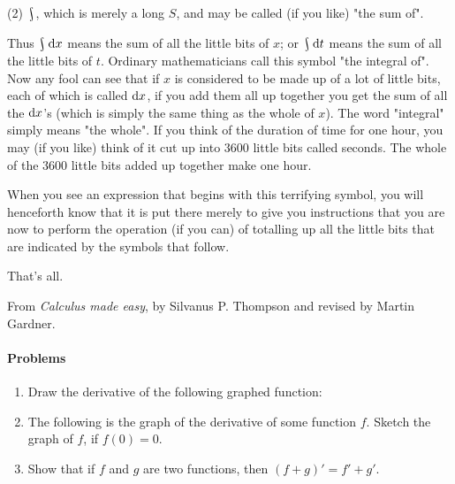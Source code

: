 (2) $ \rint $, which is merely a long $ S $, and may be called (if you like) "the sum of".

Thus $ \rint \dif{x} $ means the sum of all the little bits of $ x $; or $ \rint \dif{t} $ means
the sum of all the little bits of $ t $. Ordinary mathematicians call this symbol "the integral of".
Now any fool can see that if $ x $ is considered to be made up of a lot of little bits, each of
which is called $ \dif{x} $, if you add them all up together you get the sum of all the $ \dif{x}$'s (which
is simply the same thing as the whole of $ x $). The word "integral" simply means "the whole". If you think
of the duration of time for one hour, you may  (if you like) think of it cut up into 3600 little bits
called seconds. The whole of the 3600 little bits added up together make one hour.

When you see an expression that begins with this terrifying symbol, you will henceforth know that it is put
there merely to give you instructions that you are now to perform the operation (if you can) of totalling up
all the little bits that are indicated by the symbols that follow.

That's all.

\begin{flushright}
  From \textit{Calculus made easy}, by Silvanus P. Thompson and revised by Martin Gardner.
\end{flushright}

\paragraph{Problems}
\begin{enumerate}
  \item Draw the derivative of the following graphed function:
        \begin{center}
        \end{center}
  \item The following is the graph of the derivative of some function $ f $. Sketch the graph of $ f $, if $ f(0) = 0 $.
        \begin{center}
        \end{center}
  \item Show that if $ f $ and $ g $ are two functions, then $ (f + g)' = f' + g' $.
\end{enumerate}
